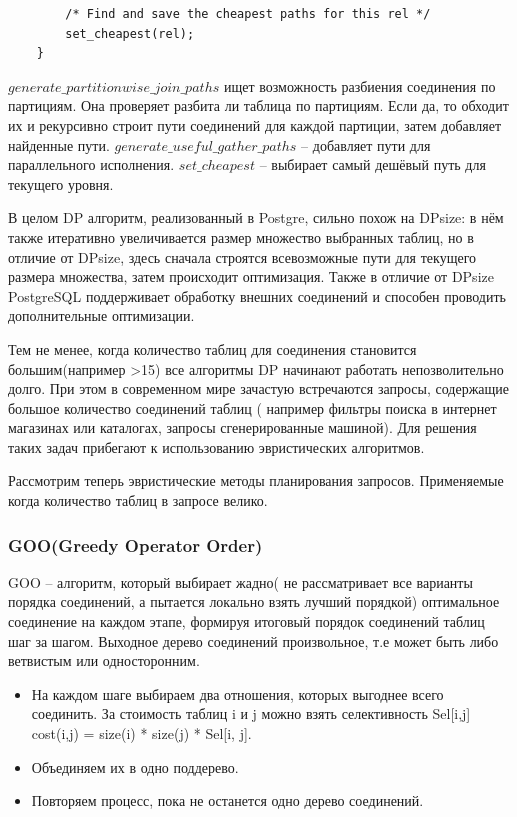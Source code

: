 \documentclass[12pt]{article}
\begin{document}
\begin{flushleft}
\begin{lstlisting}
        /* Find and save the cheapest paths for this rel */
        set_cheapest(rel);
    }

\end{lstlisting}

$generate\_partitionwise\_join\_paths$ ищет возможность разбиения соединения по партициям.
Она проверяет разбита ли таблица по партициям. Если да, то обходит их и рекурсивно строит 
пути соединений для каждой партиции, затем добавляет найденные пути.
\newline
$generate\_useful\_gather\_paths$ -- добавляет пути для параллельного 
исполнения.
\newline
$set\_cheapest$ -- выбирает самый дешёвый путь для текущего уровня.


В целом DP алгоритм, реализованный в Postgre, сильно похож на 
DPsize: в нём также итеративно увеличивается размер множество 
выбранных таблиц, но в отличие от DPsize, здесь сначала 
строятся всевозможные пути для текущего размера множества, затем происходит оптимизация. Также в отличие от DPsize PostgreSQL 
поддерживает обработку внешних соединений и способен проводить 
дополнительные оптимизации.

Тем не менее, когда количество таблиц для соединения становится большим(например >15) все алгоритмы DP начинают работать непозволительно долго. При этом в современном мире зачастую встречаются запросы, 
содержащие большое количество соединений таблиц ( например фильтры поиска в интернет магазинах или каталогах, запросы сгенерированные машиной). Для решения 
таких задач прибегают к использованию эвристических алгоритмов.


Рассмотрим теперь эвристические методы планирования запросов. Применяемые когда количество
таблиц в запросе велико.

\centering \subsubsection*{GOO(Greedy Operator Order) \cite[стр. 108]{Thomas} \cite{Allam}}
\raggedright

GOO -- алгоритм, который выбирает жадно( не рассматривает все  варианты порядка соединений, а пытается локально взять лучший порядкой) 
оптимальное соединение на каждом этапе, формируя 
итоговый порядок соединений таблиц шаг за шагом. Выходное
дерево соединений произвольное, т.е может быть либо ветвистым или односторонним.
\begin{itemize}
    \item На каждом шаге выбираем два отношения, которых выгоднее всего соединить. За стоимость таблиц i и j можно взять селективность Sel[i,j]
    cost(i,j) = size(i) * size(j) * Sel[i, j].
    \item Объединяем их в одно поддерево.
    \item Повторяем процесс, пока не останется одно дерево соединений.
\end{itemize}


\end{flushleft}
\end{document}
